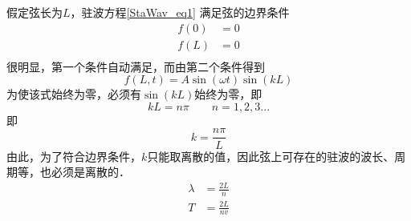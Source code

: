 假定弦长为$L$，驻波方程\autoref{StaWav_eq1} 满足弦的边界条件 
$$
\begin{aligned}
f(0)&=0\\
f(L)&=0\\
\end{aligned}
$$
很明显，第一个条件自动满足，而由第二个条件得到
$$
f(L,t)=A\sin(\omega t)\sin(kL)
$$
为使该式始终为零，必须有$\sin(kL)$始终为零，即
$$kL = n\pi \qquad n=1,2,3...$$
即
\begin{equation}
k=\frac{n\pi}{L}
\end{equation}
由此，为了符合边界条件，$k$只能取离散的值，因此弦上可存在的驻波的波长、周期等，也必须是离散的．
\begin{equation}
\begin{aligned}
\lambda &=\frac{2L}{n}\\
T &=\frac{2L}{nv}\\
\end{aligned}
\end{equation}
